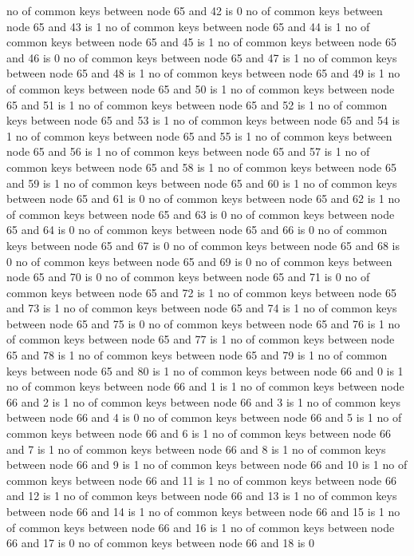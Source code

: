no of common keys between node 65 and 42 is 0
no of common keys between node 65 and 43 is 1
no of common keys between node 65 and 44 is 1
no of common keys between node 65 and 45 is 1
no of common keys between node 65 and 46 is 0
no of common keys between node 65 and 47 is 1
no of common keys between node 65 and 48 is 1
no of common keys between node 65 and 49 is 1
no of common keys between node 65 and 50 is 1
no of common keys between node 65 and 51 is 1
no of common keys between node 65 and 52 is 1
no of common keys between node 65 and 53 is 1
no of common keys between node 65 and 54 is 1
no of common keys between node 65 and 55 is 1
no of common keys between node 65 and 56 is 1
no of common keys between node 65 and 57 is 1
no of common keys between node 65 and 58 is 1
no of common keys between node 65 and 59 is 1
no of common keys between node 65 and 60 is 1
no of common keys between node 65 and 61 is 0
no of common keys between node 65 and 62 is 1
no of common keys between node 65 and 63 is 0
no of common keys between node 65 and 64 is 0
no of common keys between node 65 and 66 is 0
no of common keys between node 65 and 67 is 0
no of common keys between node 65 and 68 is 0
no of common keys between node 65 and 69 is 0
no of common keys between node 65 and 70 is 0
no of common keys between node 65 and 71 is 0
no of common keys between node 65 and 72 is 1
no of common keys between node 65 and 73 is 1
no of common keys between node 65 and 74 is 1
no of common keys between node 65 and 75 is 0
no of common keys between node 65 and 76 is 1
no of common keys between node 65 and 77 is 1
no of common keys between node 65 and 78 is 1
no of common keys between node 65 and 79 is 1
no of common keys between node 65 and 80 is 1
no of common keys between node 66 and 0 is 1
no of common keys between node 66 and 1 is 1
no of common keys between node 66 and 2 is 1
no of common keys between node 66 and 3 is 1
no of common keys between node 66 and 4 is 0
no of common keys between node 66 and 5 is 1
no of common keys between node 66 and 6 is 1
no of common keys between node 66 and 7 is 1
no of common keys between node 66 and 8 is 1
no of common keys between node 66 and 9 is 1
no of common keys between node 66 and 10 is 1
no of common keys between node 66 and 11 is 1
no of common keys between node 66 and 12 is 1
no of common keys between node 66 and 13 is 1
no of common keys between node 66 and 14 is 1
no of common keys between node 66 and 15 is 1
no of common keys between node 66 and 16 is 1
no of common keys between node 66 and 17 is 0
no of common keys between node 66 and 18 is 0
